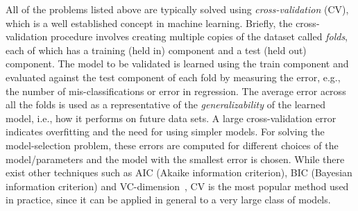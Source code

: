 \documentclass{vldb}
\begin{document}
All of the problems listed above are typically solved using {\em
cross-validation} (CV), which is a well established concept in machine learning.
Briefly, the cross-validation procedure involves creating multiple copies of the
dataset called {\em folds}, each of which has a training (held in) component and a test
(held out) component. The model to be validated is learned using the train component
and evaluated against the test component of each fold by measuring the error,
e.g., the number of mis-classifications or error in regression.
The average error across all the folds is used as a representative of the {\em
generalizability} of the learned model, i.e., how it performs
on future data sets. A large cross-validation error indicates overfitting
and the need for using simpler models. For solving the model-selection problem,
these errors are computed for different choices of the model/parameters and the
model with the smallest error is chosen.
While there exist other techniques such as AIC (Akaike information
criterion), BIC (Bayesian information criterion) and
VC-dimension~\cite{Blumer:1989:LVD:76359.76371,citeulike:849862}, CV is the
most popular method used in practice, since it can be applied in general to a
very large class of models.
\end{document}
